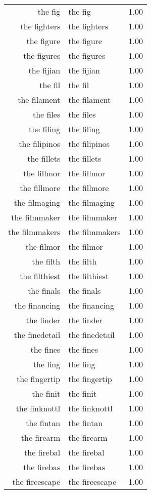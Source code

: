 \begin{table}[ht]
\begin{tabular}{rlr}
  the fig & the fig & 1.00 \\ 
  the fighters & the fighters & 1.00 \\ 
  the figure & the figure & 1.00 \\ 
  the figures & the figures & 1.00 \\ 
  the fijian & the fijian & 1.00 \\ 
  the fil & the fil & 1.00 \\ 
  the filament & the filament & 1.00 \\ 
  the files & the files & 1.00 \\ 
  the filing & the filing & 1.00 \\ 
  the filipinos & the filipinos & 1.00 \\ 
  the fillets & the fillets & 1.00 \\ 
  the fillmor & the fillmor & 1.00 \\ 
  the fillmore & the fillmore & 1.00 \\ 
  the filmaging & the filmaging & 1.00 \\ 
  the filmmaker & the filmmaker & 1.00 \\ 
  the filmmakers & the filmmakers & 1.00 \\ 
  the filmor & the filmor & 1.00 \\ 
  the filth & the filth & 1.00 \\ 
  the filthiest & the filthiest & 1.00 \\ 
  the finals & the finals & 1.00 \\ 
  the financing & the financing & 1.00 \\ 
  the finder & the finder & 1.00 \\ 
  the finedetail & the finedetail & 1.00 \\ 
  the fines & the fines & 1.00 \\ 
  the fing & the fing & 1.00 \\ 
  the fingertip & the fingertip & 1.00 \\ 
  the finit & the finit & 1.00 \\ 
  the finknottl & the finknottl & 1.00 \\ 
  the fintan & the fintan & 1.00 \\ 
  the firearm & the firearm & 1.00 \\ 
  the firebal & the firebal & 1.00 \\ 
  the firebas & the firebas & 1.00 \\ 
  the fireescape & the fireescape & 1.00 \\ 

\end{tabular}
\end{table}
